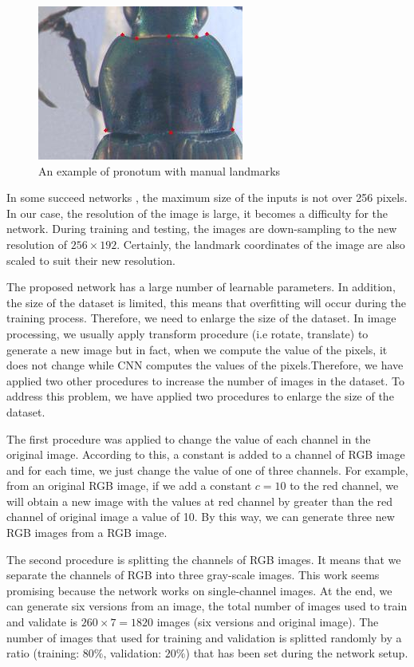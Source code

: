 \documentclass[review]{elsarticle}
\begin{document}
\begin{figure}[h!]
	\centerline{\includegraphics[scale=0.8]{images/pronotum}}
	\caption{An example of pronotum with manual landmarks}
	\label{figpronotum}
\end{figure}

In some succeed networks \cite{krizhevsky2012imagenet}\cite{sun2013deep}\cite{cintas2016automatic}, the maximum size of the inputs is not over 256 pixels. In our case, the resolution of the image is large, it becomes a difficulty for the network. During training and testing, the images are down-sampling to the new resolution of $256 \times 192$. Certainly, the landmark coordinates of the image are also scaled to suit their new resolution. 

The proposed network has a large number of learnable parameters. In addition, the size of the dataset is limited, this means that overfitting will occur during the training process. Therefore, we need to enlarge the size of the dataset. In image processing, we usually apply transform procedure (i.e rotate, translate) to generate a new image but in fact, when we compute the value of the pixels, it does not change while CNN computes the values of the pixels.Therefore, we have applied two other procedures to increase the number of images in the dataset. To address this problem, we have applied two procedures to enlarge the size of the dataset.

The first procedure was applied to change the value of each channel in the original image. According to this, a constant is added to a channel of RGB image and for each time, we just change the value of one of three channels. For example, from an original RGB image, if we add a constant $c = 10$ to the red channel, we will obtain a new image with the values at red channel by greater than the red channel of original image a value of 10. By this way, we can generate three new RGB images from a RGB image.

The second procedure is splitting the channels of RGB images. It means that we separate the channels of RGB into three gray-scale images. This work seems promising because the network works on single-channel images. At the end, we can generate six versions from an image, the total number of images used to train and validate is $260 \times 7 = 1820$ images (six versions and original image). The number of images that used for training and validation is splitted randomly by a ratio (training: $80\%$, validation: $20\%$) that has been set during the network setup.
\end{document}
